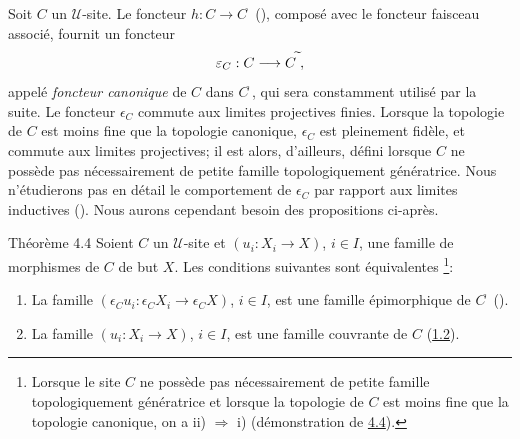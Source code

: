 \documentclass[10pt]{../fichiers-configuration-latex/smfart}
\begin{document}
\setcounter{subsection}{4} \setcounter{subsubsection}{-1}
\subsubsection{}
Soit $C$ un $𝒰$-site. Le foncteur $h:C\rightarrow
C^{\widehat{\phantom{,}}}$ (), composé avec
le foncteur faisceau associé, fournit un foncteur$$
\varepsilon_C:C\longrightarrow C^{\widetilde{\phantom{,}}}{},
$$
appelé \emph{foncteur canonique} de $C$ dans
$C^{\widetilde{\phantom{,}}}$, qui sera constamment utilisé par la
suite. Le foncteur $\epsilon_C$ commute aux limites projectives
finies. Lorsque la topologie de $C$ est moins fine que la topologie
canonique, $\epsilon_C$ est pleinement fidèle, et commute aux
limites projectives; il est alors, d'ailleurs, défini lorsque $C$
ne possède pas nécessairement de petite famille
topologiquement génératrice. Nous n'étudierons pas en détail
le comportement de $\epsilon_C$ par rapport aux limites inductives
(\cf [SGA 3 IV]). Nous aurons cependant besoin des propositions
ci-après.

\begin{enonce*}{Théorème 4.4}
Soient $C$ un $𝒰$-site et $(u_i:X_i\rightarrow X)$, $i\in
I$, une famille de morphismes de $C$ de but $X$. Les conditions
suivantes sont équivalentes \footnote[1]{Lorsque le site $C$ ne
possède pas nécessairement de petite famille topologiquement
génératrice et lorsque la topologie de $C$ est moins fine que la
topologie canonique, on a ii) $\Rightarrow$ i) (\cf démonstration
de \hyperref[II.theo4.4]{4.4}).}:
\begin{enumerate}
\renewcommand{\theenumi}{\roman{enumi}}
\renewcommand{\labelenumi}{\theenumi)}
\item La famille $(\epsilon_C u_i:\epsilon_C X_i\rightarrow \epsilon_C
  X)$, $i\in I$, est une famille épimorphique de
  $C^{\widetilde{\phantom{,}}}$ {\rm().}\pageoriginale

\item La famille $(u_i:X_i\rightarrow X)$, $i\in I$, est une famille
  couvrante de $C$ (\hyperref[II.def1.2]{1.2}).
\end{enumerate}
\end{enonce*}
\end{document}
